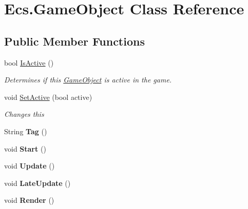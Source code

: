 \hypertarget{class_ecs_1_1_game_object}{}\section{Ecs.\+Game\+Object Class Reference}
\label{class_ecs_1_1_game_object}
\subsection*{Public Member Functions}
\begin{DoxyCompactItemize}
\item 
bool \mbox{\hyperlink{class_ecs_1_1_game_object_aa6bc70dfeda488ed71b536346d29881b}{Is\+Active}} ()
\begin{DoxyCompactList}\small\item\em Determines if this \mbox{\hyperlink{class_ecs_1_1_game_object}{Game\+Object}} is active in the game. \end{DoxyCompactList}\item 
void \mbox{\hyperlink{class_ecs_1_1_game_object_af4211e4cb1df45aa6692a5c2de79ef53}{Set\+Active}} (bool active)
\begin{DoxyCompactList}\small\item\em Changes this \end{DoxyCompactList}\item 
\mbox{\label{class_ecs_1_1_game_object_a57d652307d98be5d8f4eb4c16822eed1}} 
String {\bfseries Tag} ()
\item 
\mbox{\label{class_ecs_1_1_game_object_a075b833b0ea4e8b58cab5d2a27d9a111}} 
void {\bfseries Start} ()
\item 
\mbox{\label{class_ecs_1_1_game_object_aafeda353872b30727e1394075481beff}} 
void {\bfseries Update} ()
\item 
\mbox{\label{class_ecs_1_1_game_object_ad707ec0ef27791d2049a0125407539b0}} 
void {\bfseries Late\+Update} ()
\item 
\mbox{\label{class_ecs_1_1_game_object_aebb472921ec1b79b8dce1a5481861746}} 
void {\bfseries Render} ()
\item 
\mbox{\label{class_ecs_1_1_game_object_ab3961ec9815e23fc328c762e0f332394}} 

\end{DoxyCompactItemize}
